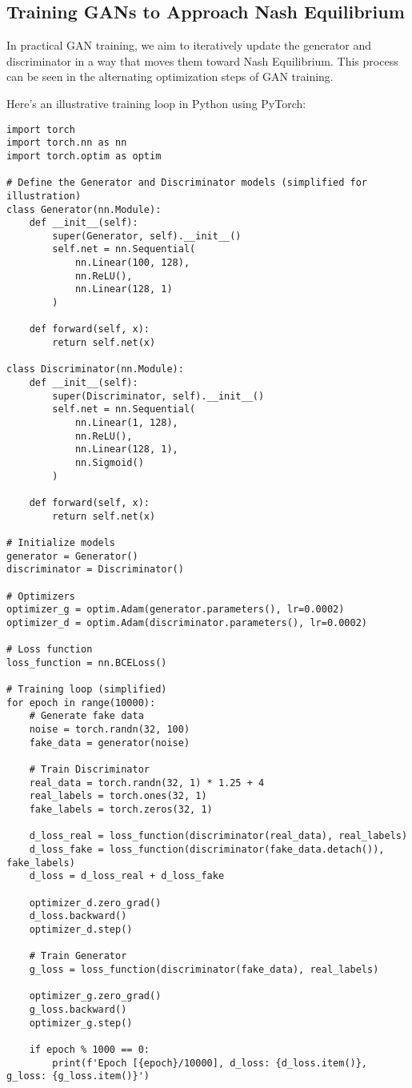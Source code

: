 \subsection{Training GANs to Approach Nash Equilibrium}
In practical GAN training, we aim to iteratively update the generator and discriminator in a way that moves them toward Nash Equilibrium. This process can be seen in the alternating optimization steps of GAN training.

Here's an illustrative training loop in Python using PyTorch:

\begin{lstlisting}[style=python]
import torch
import torch.nn as nn
import torch.optim as optim

# Define the Generator and Discriminator models (simplified for illustration)
class Generator(nn.Module):
    def __init__(self):
        super(Generator, self).__init__()
        self.net = nn.Sequential(
            nn.Linear(100, 128),
            nn.ReLU(),
            nn.Linear(128, 1)
        )

    def forward(self, x):
        return self.net(x)

class Discriminator(nn.Module):
    def __init__(self):
        super(Discriminator, self).__init__()
        self.net = nn.Sequential(
            nn.Linear(1, 128),
            nn.ReLU(),
            nn.Linear(128, 1),
            nn.Sigmoid()
        )

    def forward(self, x):
        return self.net(x)

# Initialize models
generator = Generator()
discriminator = Discriminator()

# Optimizers
optimizer_g = optim.Adam(generator.parameters(), lr=0.0002)
optimizer_d = optim.Adam(discriminator.parameters(), lr=0.0002)

# Loss function
loss_function = nn.BCELoss()

# Training loop (simplified)
for epoch in range(10000):
    # Generate fake data
    noise = torch.randn(32, 100)
    fake_data = generator(noise)

    # Train Discriminator
    real_data = torch.randn(32, 1) * 1.25 + 4
    real_labels = torch.ones(32, 1)
    fake_labels = torch.zeros(32, 1)

    d_loss_real = loss_function(discriminator(real_data), real_labels)
    d_loss_fake = loss_function(discriminator(fake_data.detach()), fake_labels)
    d_loss = d_loss_real + d_loss_fake

    optimizer_d.zero_grad()
    d_loss.backward()
    optimizer_d.step()

    # Train Generator
    g_loss = loss_function(discriminator(fake_data), real_labels)

    optimizer_g.zero_grad()
    g_loss.backward()
    optimizer_g.step()

    if epoch % 1000 == 0:
        print(f'Epoch [{epoch}/10000], d_loss: {d_loss.item()}, g_loss: {g_loss.item()}')
\end{lstlisting}

